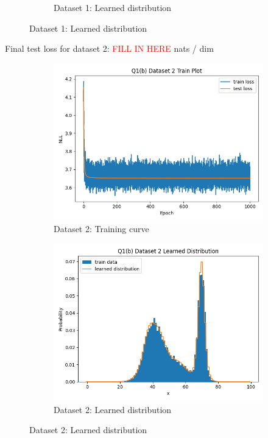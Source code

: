 \documentclass{article}
\begin{document}
\begin{enumerate}[(a)]
\begin{figure}[H]
\begin{subfigure}{0.45\textwidth}
        \caption{Dataset 1: Learned distribution}
    \end{subfigure}
\end{figure}
Final test loss for dataset 2: \textcolor{red}{FILL IN HERE}  nats / dim
\begin{figure}[H]
    \centering
    \begin{subfigure}{0.45\textwidth}
        \centering
        \includegraphics[width=\textwidth]{figures/q1_b_dset2_train_plot.png}
        \caption{Dataset 2: Training curve}
    \end{subfigure}
    \hspace{0.2in}
    \begin{subfigure}{0.45\textwidth}
        \centering
        \includegraphics[width=\textwidth]{figures/q1_b_dset2_learned_dist.png}
        \caption{Dataset 2: Learned distribution}
    \end{subfigure}
\end{figure}
\end{enumerate}
\end{document}
